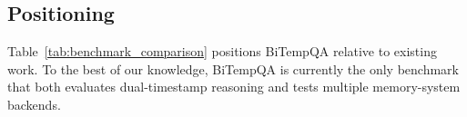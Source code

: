 \subsection{Positioning}
Table~\ref{tab:benchmark_comparison} positions BiTempQA relative to existing work.
To the best of our knowledge, BiTempQA is currently the only benchmark that both evaluates dual-timestamp reasoning and tests multiple memory-system backends.

\begin{table}[t]
\centering
{}
\caption{Comparison with related benchmarks. \textbf{Dual TS}: evaluates dual-timestamp reasoning. \textbf{Mem}: tests memory backends (not just LLMs). BiTempQA uniquely combines dual-timestamp evaluation with memory backend testing.}
\label{tab:benchmark_comparison}
\end{table}
